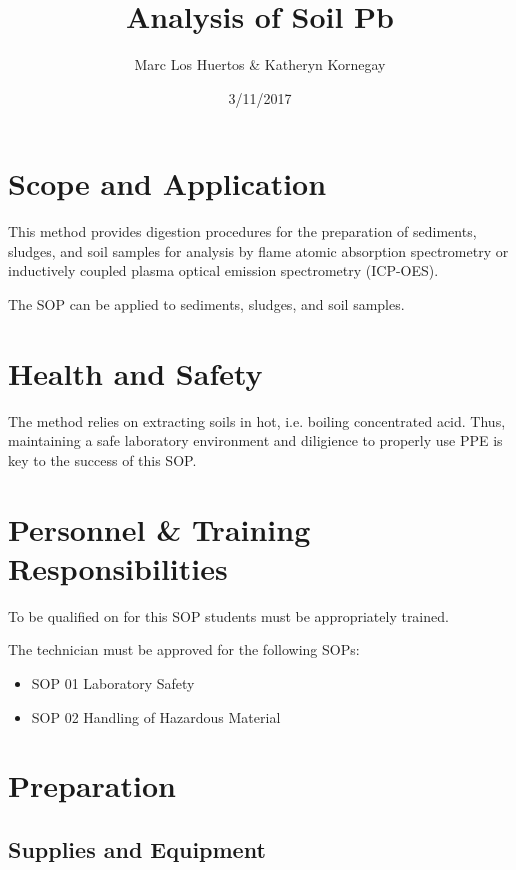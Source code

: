 \documentclass[12pt]{../SOP3_alpha}
\title{Analysis of Soil Pb}
\date{3/11/2017}
\author{Marc Los Huertos \& Katheryn Kornegay}
\begin{document}


\maketitle

\section{Scope and Application}

\NP This method provides digestion procedures for the preparation of sediments, sludges, and soil samples for analysis by flame atomic absorption spectrometry or inductively coupled plasma optical emission spectrometry (ICP-OES).

\NP The SOP can be applied to sediments, sludges, and soil samples.

\tableofcontents

\newpage

\section{Health and Safety}

\NP The method relies on extracting soils in hot, i.e. boiling concentrated acid. Thus, maintaining a safe laboratory environment and diligience to properly use PPE is key to the success of this SOP. 


\section{Personnel \& Training Responsibilities}

\NP To be qualified on for this SOP students must be appropriately trained.

The technician must be approved for the following SOPs:

\begin{itemize}
  \item SOP 01 Laboratory Safety
  \item SOP 02 Handling of Hazardous Material
\end{itemize}


\section{Preparation}

\subsection{Supplies and Equipment}
\end{document}
